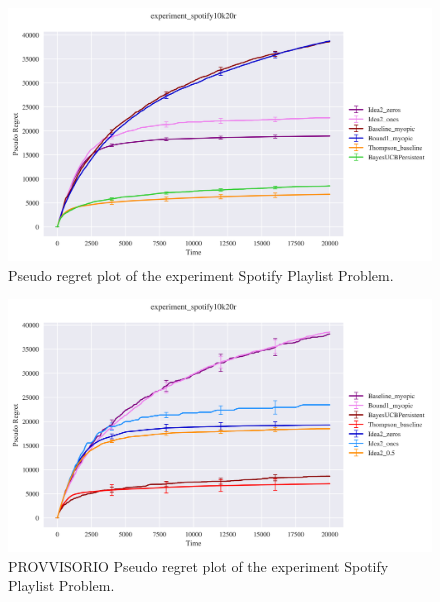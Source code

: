 
\begin{figure}[H]
	\includegraphics[width=16cm]{./images/experiment_spotify10k20r ANALYTICS.png}
	\centering	
	\caption{Pseudo regret plot of the experiment Spotify Playlist Problem.}
\end{figure}

\begin{figure}[H]
	\includegraphics[width=16cm]{./images/provvisori/experiment_spotify10k20r ANALYTICS.png}
	\centering	
	\caption{PROVVISORIO Pseudo regret plot of the experiment Spotify Playlist Problem.}
\end{figure}


